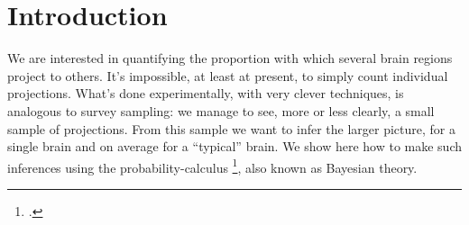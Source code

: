 \documentclass[\ifafour a4paper,12pt,\else a5paper,10pt,\fi%
onecolumn,oneside,article,%
british%
]{memoir}
\title{\propertitle}
\author{%
\hspace*{\stretch{1}}%
\parbox{0.49\linewidth}%
{\protect\centering P.G.L.  Porta Mana\\%
\footnotesize\epost{\email{piero.mana}{ntnu.no}}}%
\hspace*{\stretch{1}}%
\parbox{0.49\linewidth}%
{\protect\centering B. Jacobsen\\%
\footnotesize\epost{\email{bente.jacobsen}{ntnu.no}}}%
\hspace*{\stretch{1}}%
}
\date{\firstpublished; updated \updated}
\theoremstyle{remark}
\theoremstyle{innote}
\newcommand*{\citep}{\footcites}
\newcommand*{\amp}{\&}
\newcommand*{\asudedication}[1]{%
{\par\centering\textit{#1}\par}}
\renewcommand*{\|}[1][]{\nonscript\,#1\vert\nonscript\;\mathopen{}}
\begin{document}
\captiondelim{\quad}\captionnamefont{\footnotesize}\captiontitlefont{\footnotesize}
\frenchspacing
\maketitle

\abstractrunin
\abslabeldelim{}
\renewcommand*{\abstractname}{}
\setlength{\absleftindent}{0pt}
\setlength{\absrightindent}{0pt}
\setlength{\abstitleskip}{-\absparindent}
\begin{abstract}%
  \noindent Some memos on the problem of inferring connectivity by means of
  the probability-calculus aka Bayesian theory.
\end{abstract}
\frenchspacing





\section{Introduction}
\label{sec:intro}

We are interested in quantifying the proportion with which several brain
regions project to others. It's impossible, at least at present, to simply
count individual projections. What's done experimentally, with very clever
techniques, is analogous to survey sampling: we manage to see, more or less
clearly, a small sample of projections. From this sample we want to infer
the larger picture, for a single brain and on average for a
\enquote{typical} brain. We show here how to make such inferences using the
probability-calculus
\citep{jaynes1994_r2003,hailperin1996,soxetal1988_r2013}, also known as
Bayesian theory.
\end{document}
